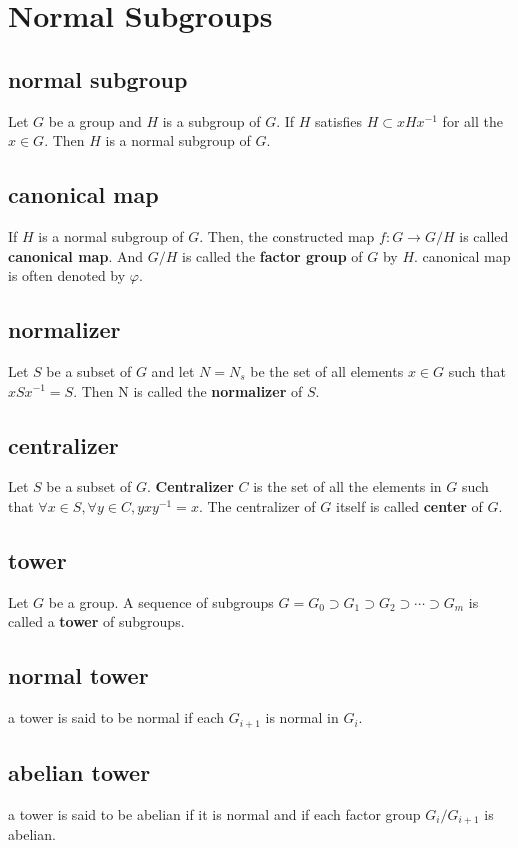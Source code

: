 \documentclass[11pt]{article}
\begin{document}
\section{Normal Subgroups}
\label{sec:orgd8180c1}
\subsection{normal subgroup}
\label{sec:orgecf6700}
Let \(G\) be a group and \(H\) is a subgroup of \(G\).
If \(H\) satisfies \(H \subset xHx^{-1}\) for all the \(x\in G\).
Then \(H\) is a normal subgroup of \(G\).
\subsection{canonical map}
\label{sec:orga3cbc1f}
If \(H\) is a normal subgroup of \(G\).
Then, the constructed map \(f: G\to G/H\) is called \textbf{canonical map}.
And \(G/H\) is called the \textbf{factor group} of \(G\) by \(H\).
canonical map is often denoted by \(\varphi\).
\subsection{normalizer}
\label{sec:org2271f26}
Let \(S\) be a subset of \(G\) and let \(N = N_s\) be the set of 
all elements \(x\in G\) such that \(xSx^{-1} = S\). Then N
is called the \textbf{normalizer} of \(S\).
\subsection{centralizer}
\label{sec:org1ea247c}
Let \(S\) be a subset of \(G\).
\textbf{Centralizer} \(C\) is the set of all the elements in \(G\) such that
\(\forall x\in S, \forall y\in C, yxy^{-1} = x\).
The centralizer of \(G\) itself is called \textbf{center} of \(G\).
\subsection{tower}
\label{sec:org4e81365}
Let \(G\) be a group. A sequence of subgroups
\(G = G_0 \supset G_1 \supset G_2 \supset \cdots \supset G_m\)
is called a \textbf{tower} of subgroups.
\subsection{normal tower}
\label{sec:orgb71d5fb}
a tower is said to be normal if each \(G_{i+1}\) is normal in \(G_i\).
\subsection{abelian tower}
\label{sec:orgf85b401}
a tower is said to be abelian if it is normal and if each factor 
group \(G_i/G_{i+1}\) is abelian.
\end{document}

